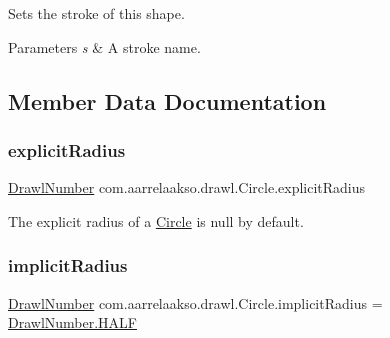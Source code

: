 Sets the stroke of this shape. 


\begin{DoxyParams}{Parameters}
{\em s} & A stroke name. \\
\hline
\end{DoxyParams}


\subsection{Member Data Documentation}
\mbox{\label{classcom_1_1aarrelaakso_1_1drawl_1_1_circle_a125baa27e0cf2e667361e0637cd82e7c}} 
\subsubsection{\texorpdfstring{explicit\+Radius}{explicitRadius}}
{\footnotesize\ttfamily \hyperlink{classcom_1_1aarrelaakso_1_1drawl_1_1_drawl_number}{Drawl\+Number} com.\+aarrelaakso.\+drawl.\+Circle.\+explicit\+Radius\hspace{0.3cm}{\ttfamily [private]}}



The explicit radius of a \hyperlink{classcom_1_1aarrelaakso_1_1drawl_1_1_circle}{Circle} is null by default. 

\mbox{\label{classcom_1_1aarrelaakso_1_1drawl_1_1_circle_afb7f13978788e711c490cec96e9f899a}} 
\subsubsection{\texorpdfstring{implicit\+Radius}{implicitRadius}}
{\footnotesize\ttfamily \hyperlink{classcom_1_1aarrelaakso_1_1drawl_1_1_drawl_number}{Drawl\+Number} com.\+aarrelaakso.\+drawl.\+Circle.\+implicit\+Radius = \hyperlink{classcom_1_1aarrelaakso_1_1drawl_1_1_drawl_number_ae0980b8dd35b0bb52b87b37700d15322}{Drawl\+Number.\+H\+A\+LF}\hspace{0.3cm}{\ttfamily [private]}}




